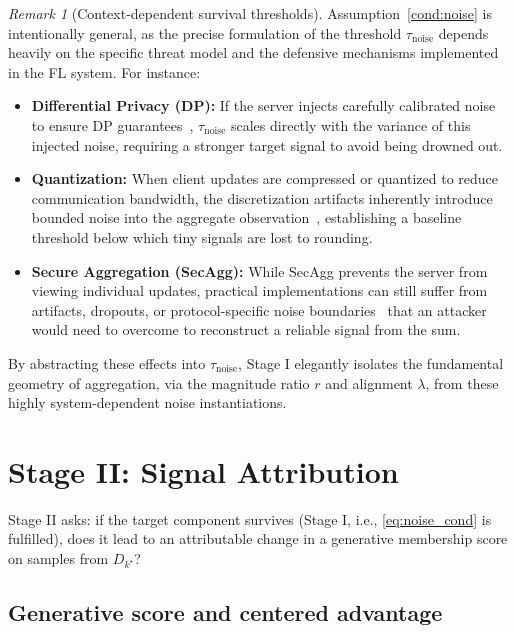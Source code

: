 \documentclass{article}
\theoremstyle{plain}
\theoremstyle{definition}
\theoremstyle{remark}
\newtheorem{remark}{Remark}
\numberwithin{theorem}{section}
\numberwithin{definition}{section}
\numberwithin{remark}{section}
\numberwithin{lemma}{section}
\numberwithin{assumption}{section}
\newcommand{\tindex}{k^\star}
\begin{document}
\begin{remark}[Context-dependent survival thresholds]
Assumption~\ref{cond:noise} is intentionally general, as the precise formulation of the threshold $\tau_{\mathrm{noise}}$ depends heavily on the specific threat model and the defensive mechanisms implemented in the FL system. For instance:
\begin{itemize}[leftmargin=*]
    \item \textbf{Differential Privacy (DP):} If the server injects carefully calibrated noise to ensure DP guarantees~\cite{kim2022effects}, $\tau_{\mathrm{noise}}$ scales directly with the variance of this injected noise, requiring a stronger target signal to avoid being drowned out.
    \item \textbf{Quantization:} When client updates are compressed or quantized to reduce communication bandwidth, the discretization artifacts inherently introduce bounded noise into the aggregate observation~\cite{kang2024effect}, establishing a baseline threshold below which tiny signals are lost to rounding.
    \item \textbf{Secure Aggregation (SecAgg):} While SecAgg prevents the server from viewing individual updates, practical implementations can still suffer from artifacts, dropouts, or protocol-specific noise boundaries~\cite{gilbert2022secure} that an attacker would need to overcome to reconstruct a reliable signal from the sum.
\end{itemize}
By abstracting these effects into $\tau_{\mathrm{noise}}$, Stage I elegantly isolates the fundamental geometry of aggregation, via the magnitude ratio $r$ and alignment $\lambda$, from these highly system-dependent noise instantiations.
\end{remark}

\section{Stage II: Signal Attribution}
\label{sec:stage2}

Stage II asks: if the target component survives (Stage I, i.e., \eqref{eq:noise_cond} is fulfilled), does it lead to an attributable change in a generative membership score on samples from $D_{\tindex}$?

\subsection{Generative score and centered advantage}
\end{document}
